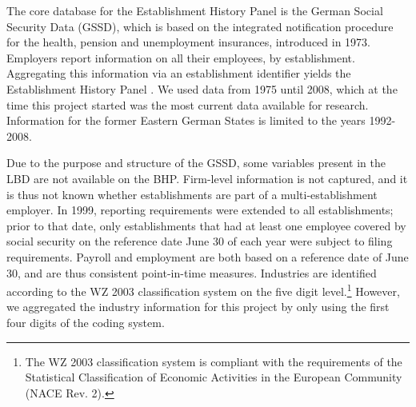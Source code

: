 
The core database for the Establishment History Panel is the German Social Security Data  (GSSD), which is based on the integrated notification procedure for the health, pension and unemployment insurances,   introduced in  1973. Employers report information on all their employees, by establishment. Aggregating this information via an establishment identifier yields the Establishment History Panel \citep[German abbreviation: BHP]{BHP}. We used data from  1975 until 2008, which at the time this project started was the most current data available for research. Information for the former Eastern German States is limited to the years 1992-2008. 

Due to the purpose and structure of the GSSD, some variables present in the \ac{LBD} are not available on the  \ac{BHP}. Firm-level information is not captured, and it is thus not known whether establishments are part of a multi-establishment employer. In 1999, reporting requirements were extended to all establishments; prior to that date, only establishments that  had at least one employee covered by social security on the reference date June 30 of each year were subject to filing requirements. Payroll and employment are both based on a reference date of June 30, and are thus consistent point-in-time measures. 
Industries are identified according to the WZ 2003 classification system \citep{WZ2008} on the five digit level.\footnote{The WZ 2003 classification system is compliant with the requirements of the Statistical Classification of Economic Activities in the European Community (NACE Rev. 2).} However, we aggregated the industry information for this project by only using the first four digits of the coding system.




